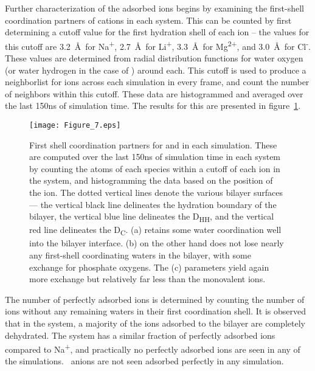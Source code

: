 Further characterization of the adsorbed ions begins by examining the first-shell coordination partners of cations in each system.
This can be counted by first determining a cutoff value for the first hydration shell of each ion 
-- the values for this cutoff are
3.2~\AA~for Na\textsuperscript{+}, 2.7~\AA~for Li\textsuperscript{+}, 3.3~\AA~for Mg\textsuperscript{2+}, 
and 3.0~\AA~for Cl\textsuperscript{-}. 
These values are determined from radial distribution 
functions for water oxygen (or water hydrogen in the case of \cl) around each. 
This cutoff is used to produce a neighborlist for ions
across each simulation in every frame, and count the number of neighbors within this cutoff. 
These data {are} histogrammed and averaged over
the last 150ns of simulation time. The results for this are presented in figure~\ref{figch3:cood}.
\begin{figure}[H]
    \caption[First shell coordinators for \li{} and \mg{}]{First shell coordination partners 
        for \li{} and \mg{} in each simulation. 
        These are computed over the last 150ns of 
        simulation time in each system by counting 
        the atoms of each species within a cutoff 
        of each ion in the system, and histogramming 
        the data based on the position of the ion. 
        The dotted vertical lines denote the various 
        bilayer surfaces --- the vertical black
        line delineates the hydration boundary of the bilayer,
        the vertical blue line delineates the D\textsubscript{HH},
        and the vertical red line delineates the D\textsubscript{C}.
        \li{} (a) retains some water 
        coordination well into the bilayer
        interface.
        \mgmbnbfix{}(b) on the other hand does not lose
        nearly any first-shell coordinating
        waters in the bilayer, with some exchange for phosphate
        oxygens. The \mgmicro{} (c) parameters yield again more exchange but 
        relatively far less than the monovalent
    ions.}
    \label{figch3:cood}
    \texttt{[image: Figure\_7.eps]}
\end{figure}

The number of perfectly adsorbed ions is determined by counting the number of ions without any remaining 
waters in their first coordination shell. It is observed that in the \na{} system, a 
majority of the ions adsorbed to the bilayer are completely dehydrated. %
The \li{} system has a similar fraction of perfectly adsorbed ions compared to Na\textsuperscript{+}, 
and practically no perfectly adsorbed 
ions are seen in any of the \mg{} simulations.\ \cl{} anions are not seen adsorbed perfectly in any simulation.

